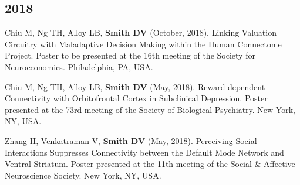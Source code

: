 \documentclass[11pt, letterpaper]{article}
\begin{document}
\subsection*{2018}
\begin{hangparas}{.5in}{1}

Chiu M, Ng TH, Alloy LB, \textbf{Smith DV} (October, 2018). Linking Valuation Circuitry with Maladaptive Decision Making within the Human Connectome Project. Poster to be presented at the 16th meeting of the Society for Neuroeconomics. Philadelphia, PA, USA.

Chiu M, Ng TH, Alloy LB, \textbf{Smith DV} (May, 2018). Reward-dependent Connectivity with Orbitofrontal Cortex in Subclinical Depression. Poster presented at the 73rd meeting of the Society of Biological Psychiatry. New York, NY, USA.

Zhang H, Venkatraman V, \textbf{Smith DV} (May, 2018). Perceiving Social Interactions Suppresses Connectivity between the Default Mode Network and Ventral Striatum. Poster presented at the 11th meeting of the Social \& Affective Neuroscience Society. New York, NY, USA. \\

\end{hangparas}
\end{document}
